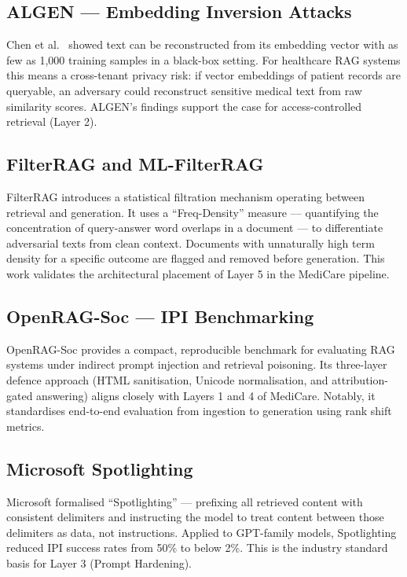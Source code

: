 \subsection{ALGEN --- Embedding Inversion Attacks}
Chen et al.\ \cite{algen2025} showed text can be reconstructed from its embedding vector with as few as 1{,}000 training samples in a black-box setting. For healthcare RAG systems this means a cross-tenant privacy risk: if vector embeddings of patient records are queryable, an adversary could reconstruct sensitive medical text from raw similarity scores. ALGEN's findings support the case for access-controlled retrieval (Layer 2).

\subsection{FilterRAG and ML-FilterRAG}
FilterRAG \cite{filterrag2025} introduces a statistical filtration mechanism operating between retrieval and generation. It uses a ``Freq-Density'' measure --- quantifying the concentration of query-answer word overlaps in a document --- to differentiate adversarial texts from clean context. Documents with unnaturally high term density for a specific outcome are flagged and removed before generation. This work validates the architectural placement of Layer 5 in the MediCare pipeline.

\subsection{OpenRAG-Soc --- IPI Benchmarking}
OpenRAG-Soc \cite{openragsoc2025} provides a compact, reproducible benchmark for evaluating RAG systems under indirect prompt injection and retrieval poisoning. Its three-layer defence approach (HTML sanitisation, Unicode normalisation, and attribution-gated answering) aligns closely with Layers 1 and 4 of MediCare. Notably, it standardises end-to-end evaluation from ingestion to generation using rank shift metrics.

\subsection{Microsoft Spotlighting}
Microsoft \cite{microsoftspotlighting} formalised ``Spotlighting'' --- prefixing all retrieved content with consistent delimiters and instructing the model to treat content between those delimiters as data, not instructions. Applied to GPT-family models, Spotlighting reduced IPI success rates from 50\% to below 2\%. This is the industry standard basis for Layer 3 (Prompt Hardening).

